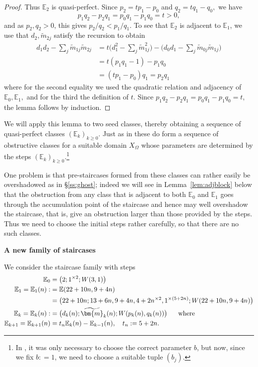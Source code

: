 \documentclass[11pt, reqno]{amsart}
\theoremstyle{remark}
\numberwithin{equation}{subsection}
\numberwithin{figure}{section}
\theoremstyle{customremark}
\newcommand{\Tm}{{\widetilde m}}
\newcommand{\NI}{{\noindent}}
\newcommand{\bE}{{\mathbb E}}
\newcommand{\Om}{{\Omega}}
\newcommand{\MS}{{\medskip}}
\newcommand{\comm}[1]{\marginpar{\tiny #1 }}
\newcommand{\btm}{\widetilde{\bm{m}}}
\begin{document}
\begin{proof}
Thus $\bE_2$ is quasi-perfect. 
Since $p_2=tp_1-p_0$ and $q_2=tq_1-q_0,$ we have
\[ p_1q_2-p_2q_1=p_0q_1-p_1q_0=t>0,\]
and as $p_2,q_2>0$, this gives $p_2/q_2<p_1/q_1.$ To see that $\bE_2$ is adjacent to $\bE_1$, we use that $d_2,\Tm_{2j}$ satisfy the recursion to obtain
\begin{align*}
d_1d_2-\sum_j\Tm_{1j}\Tm_{2j}
&=
t\bigl(d_1^2-\sum_j\Tm_{1j}^2\bigr)
-\bigl(d_0d_1-\sum_j\Tm_{0j}\Tm_{1j}\bigr)\\
&=
t(p_1q_1-1)-p_1q_0\\
&=
(tp_1-p_0)q_1
=
p_2q_1
\end{align*} 
where for the second equality we used the quadratic relation and adjacency of $\bE_0,\bE_1,$
and for the third the definition of $t$.  Since $p_1q_2-p_2q_1=p_0q_1-p_1q_0 = t$,  the lemma follows by induction.
\end{proof}


We will apply this lemma to two seed classes, 
 thereby obtaining a sequence of quasi-perfect classes $(\bE_k)_{k\ge 0}$.  
Just as in \cite{MM,MMW} these do form a sequence of obstructive classes for a suitable domain $X_\Om$ whose parameters are determined by the steps $(\bE_k)_{k\ge 0}$.\footnote{
In \cite{MM,MMW}, it was only necessary to choose the correct parameter $b$, but now, since we fix $b: = 1$,  we need to choose  a suitable tuple $(b_j)$.}

One  problem is that 
pre-staircases formed from these classes can rather easily be overshadowed as  in  \S\ref{ss:ghost}; indeed we will see in Lemma~\ref{lem:adjblock} below  that the obstruction from any  class that is adjacent to both $\bE_0$ and $\bE_1$ goes through the accumulation point of the staircase and hence may well overshadow the staircase, that is, give an obstruction larger than those provided by the steps.
  Thus we need to choose the initial steps rather carefully, so that there are no such classes.
\MS


\NI {\bf A new family of staircases}

We  consider the staircase family with steps
\begin{align} \label{eq:seedEx} \bE_0&=\bigl(2;1^{\times 2};W(3,1)\bigr)\\ \notag
 \bE_1 = \bE_1(n):  &=\bE(22+10n,9+4n)\\\notag
 &=\bigl(22+10n;13+6n,9+4n,4+2n^{\times 2},1^{\times (5+2n)};W(22+10n,9+4n)\bigr)\\\notag
 \bE_k = \bE_k(n): & = \bigl(d_k(n);\btm_k(n);W(p_k(n),q_k(n))\bigr) \ \quad \mbox{ where }\\\notag
 \bE_{k+1} = \bE_{k+1}(n) &= t_n \bE_k(n) - \bE_{k-1}(n),\quad t_n: = 5 + 2n.
\end{align}
\end{document}
